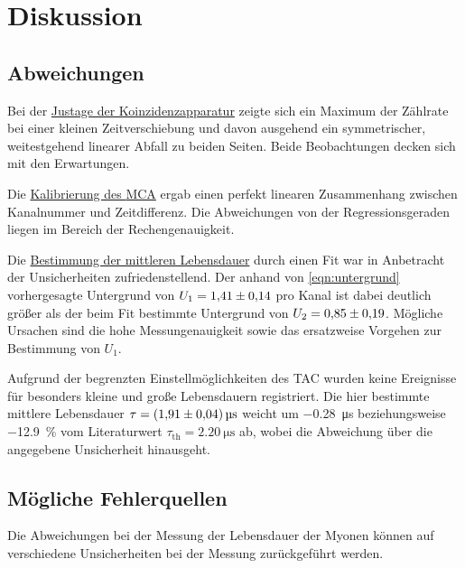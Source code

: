 \section{Diskussion}
\label{sec:diskussion}

\subsection{Abweichungen}
Bei der \hyperref[sec:auswertung:koinzidenz]{Justage der Koinzidenzapparatur} zeigte sich
ein Maximum der Zählrate bei einer kleinen Zeitverschiebung
und davon ausgehend ein symmetrischer, weitestgehend linearer Abfall zu beiden Seiten.
Beide Beobachtungen decken sich mit den Erwartungen. %

Die \hyperref[sec:auswertung:mca]{Kalibrierung des \acs{MCA}} ergab einen perfekt linearen Zusammenhang zwischen Kanalnummer und Zeitdifferenz.
Die Abweichungen von der Regressionsgeraden liegen im Bereich der Rechengenauigkeit.

Die \hyperref[sec:auswertung:lebensdauer]{Bestimmung der mittleren Lebensdauer} durch einen Fit war in Anbetracht der Unsicherheiten zufriedenstellend.
Der anhand von \autoref{eqn:untergrund} vorhergesagte Untergrund von
$U_1 = \num{1.41 \pm 0.14}$ pro Kanal
ist dabei deutlich größer als der beim Fit bestimmte Untergrund von
$U_2 = \num{0.85 \pm 0.19}$.
Mögliche Ursachen sind die hohe Messungenauigkeit sowie das ersatzweise Vorgehen zur Bestimmung von $U_1$.

Aufgrund der begrenzten Einstellmöglichkeiten des \ac{TAC} wurden keine Ereignisse für besonders kleine und große Lebensdauern registriert.
Die hier bestimmte mittlere Lebensdauer $\tau = \SI{1.91 \pm 0.04}{\micro\second}$
weicht um \SI{-0.28}{\micro\second} beziehungsweise \SI{-12.9}{\percent} vom Literaturwert $\tau_\text{th} = \SI{2.20}{\micro\second}$ \cite{pdg} ab,
wobei die Abweichung über die angegebene Unsicherheit hinausgeht.


\subsection{Mögliche Fehlerquellen}

Die Abweichungen bei der Messung der Lebensdauer der Myonen können auf verschiedene Unsicherheiten bei der Messung zurückgeführt werden.

